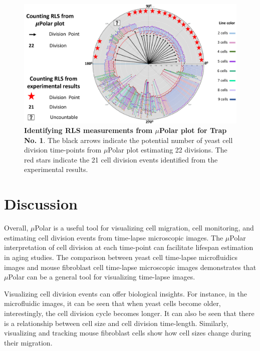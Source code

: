 \documentclass[conference]{IEEEtran}
\begin{document}
\begin{figure}
\centering
\includegraphics[width=\textwidth,height=10 cm]{Patterns/rlsTp1.pdf}
\caption{ \textbf{Identifying RLS measurements from $\mu$Polar plot for Trap No. 1}. The black arrows indicate the potential number of yeast cell division time-points from $\mu$Polar plot estimating 22 divisions. The red stars indicate the 21 cell division events identified from the experimental results.
}
\label{fig:rls}
\end{figure}

\section{Discussion}

Overall, $\mu$Polar is a useful tool for visualizing cell migration, cell monitoring, and estimating cell division events from time-lapse microscopic images. The $\mu$Polar interpretation of cell division at each time-point can facilitate lifespan estimation in aging studies. The comparison between yeast cell time-lapse microfluidics images and mouse fibroblast cell time-lapse microscopic images demonstrates that $\mu$Polar can be a general tool for visualizing time-lapse images.

Visualizing cell division events can offer biological insights. 
For instance, in the microfluidic images, it can be seen that when yeast cells become older, interestingly, the cell division cycle becomes longer. It can also be seen that there is a relationship between cell size and cell division time-length. Similarly, visualizing and tracking mouse fibroblast cells show how cell sizes change during their migration. 
\end{document}
